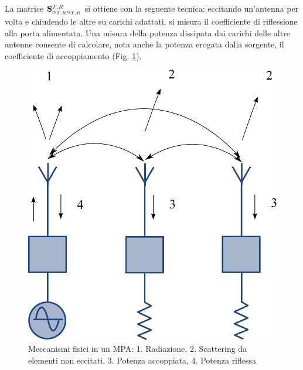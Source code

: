 \documentclass[technote]{IEEEtran}
\begin{document}
La matrice ${{\bf{S}}_{{\alpha_{T,R}}{\alpha_{T,R}}}^{T,R}}$ si ottiene con la seguente tecnica: eccitando un'antenna per volta e chiudendo le altre su carichi adattati, si misura il coefficiente di riflessione alla porta alimentata. Una misura della potenza dissipata dai carichi delle altre antenne consente di calcolare, nota anche la potenza erogata dalla sorgente, il coefficiente di accoppiamento (Fig. \ref{fig:17}).
\begin{figure}[!h]
\centering
\includegraphics[width=0.5\columnwidth]{figure17}
\caption{Meccanismi fisici in un MPA: 1. Radiazione, 2. Scattering da elementi non eccitati, 3. Potenza accoppiata, 4. Potenza riflessa }
\label{fig:17}
\end{figure} 
\end{document}
